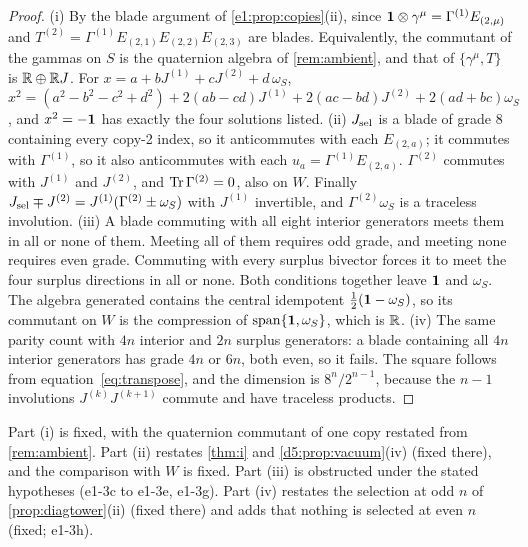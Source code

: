 \begin{proof}
(i) By the blade argument of \cref{e1:prop:copies}(ii), since $\mathbf 1\otimes\gamma^\mu=\Gamma^{(1)}E_{(2,\mu)}$ and
$T^{(2)}=\Gamma^{(1)}E_{(2,1)}E_{(2,2)}E_{(2,3)}$ are blades. Equivalently, the commutant of the gammas on $S$ is the quaternion algebra of \cref{rem:ambient}, and that of $\{\gamma^\mu,T\}$ is $\mathbb{R}\oplus\mathbb{R} J$. For $x=a+bJ^{(1)}+cJ^{(2)}+d\,\omega_S$,
$x^2=(a^2-b^2-c^2+d^2)+2(ab-cd)J^{(1)}+2(ac-bd)J^{(2)}+2(ad+bc)\omega_S$, and $x^2=-\mathbf 1$ has exactly the four solutions listed. (ii) $J_{\rm sel}$ is a blade of
grade $8$ containing every copy-2 index, so it anticommutes with each $E_{(2,a)}$; it commutes with $\Gamma^{(1)}$, so it also
anticommutes with each $u_a=\Gamma^{(1)}E_{(2,a)}$. $\Gamma^{(2)}$ commutes with
$J^{(1)}$ and $J^{(2)}$, and $\operatorname{Tr}\Gamma^{(2)}=0$, also on $W$. Finally $J_{\rm sel}\mp J^{(2)}=J^{(1)}(\Gamma^{(2)}\pm\omega_S)$ with $J^{(1)}$
invertible, and $\Gamma^{(2)}\omega_S$ is a traceless involution. (iii) A blade commuting with all eight interior generators meets them in all or none
of them. Meeting all of them requires odd grade, and meeting none requires even grade. Commuting with every surplus bivector forces it to meet
the four surplus directions in all or none. Both conditions together leave $\mathbf 1$ and $\omega_S$. The algebra generated contains the
central idempotent $\tfrac12(\mathbf 1-\omega_S)$, so its commutant on $W$ is the compression of $\operatorname{span}\{\mathbf 1,\omega_S\}$, which is $\mathbb{R}$.
(iv) The same parity count with $4n$ interior and $2n$ surplus generators: a blade containing all $4n$ interior generators has grade $4n$ or
$6n$, both even, so it fails. The square follows from equation~\cref{eq:transpose}, and the dimension is $8^n/2^{n-1}$, because the $n-1$
involutions $J^{(k)}J^{(k+1)}$ commute and have traceless products.
\end{proof}

Part (i) is fixed, with the quaternion commutant of one copy restated from \cref{rem:ambient}. Part (ii) restates \cref{thm:i} and \cref{d5:prop:vacuum}(iv) (fixed there), and the comparison with $W$ is fixed. Part (iii) is obstructed under the
stated hypotheses (e1-3c to e1-3e, e1-3g). Part (iv) restates the selection at odd $n$ of \cref{prop:diagtower}(ii) (fixed there)
and adds that nothing is selected at even $n$ (fixed; e1-3h).

